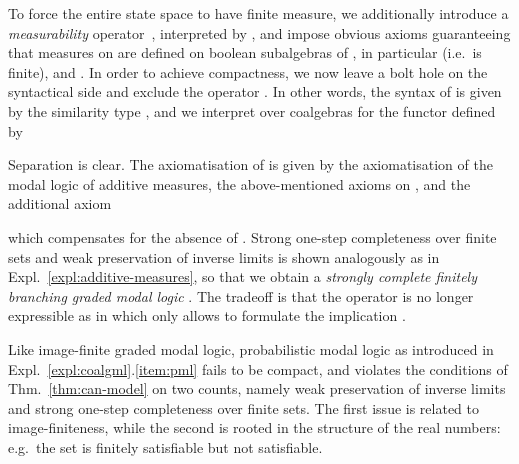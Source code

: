 \documentclass[proceedings]{stacs}
\theoremstyle{definition}
\theoremstyle{plain}
\begin{document}
\newcommand{\GMLm}{\mathrm{GML}^-}
\begin{exa}\label{expl:gmlm}

  To force the entire state space to have finite measure, we
  additionally introduce a \emph{measurability} operator~,
  interpreted by , and impose
  obvious axioms guaranteeing that measures on  are defined on
  boolean subalgebras of , in particular  (i.e.\
   is finite), and . In order to achieve
  compactness, we now leave a bolt hole on the syntactical side and
  exclude the operator . In other words, the syntax of  is
  given by the similarity type
,
and we interpret  over coalgebras for the functor 
 defined by

Separation is clear. 
The axiomatisation of  is given by the axiomatisation of the
modal logic of additive measures, the above-mentioned axioms on ,
and the additional axiom 

which compensates for the absence of . Strong one-step
completeness over finite sets and weak preservation of inverse limits
is shown analogously as in Expl.~\ref{expl:additive-measures}, so that
we obtain a \emph{strongly complete finitely branching graded modal
  logic }. The tradeoff is that the operator 
	is no longer expressible as  in  which only allows to formulate the implication
.
\end{exa}



\begin{exa}
Like image-finite graded modal logic, probabilistic modal logic as
introduced in Expl.~\ref{expl:coalgml}.\ref{item:pml} fails to be
compact, and violates the conditions of Thm.~\ref{thm:can-model} on
two counts, namely weak preservation of inverse limits and strong
one-step completeness over finite sets. The first issue is related to
image-finiteness, while the second is rooted in the structure of the
real numbers: e.g.\ the set  is finitely satisfiable but not satisfiable. 
\end{exa}
\end{document}
